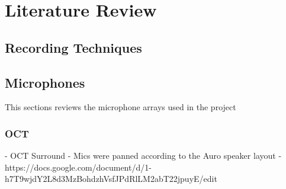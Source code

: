 
















\section{Literature Review} \label{lit}

	\subsection{Recording Techniques}

	\subsection{Microphones} \label{lit:microphones}
	
		This sections reviews the microphone arrays used in the project

		\subsubsection{OCT} \label{sec:OCT}

			- OCT Surround
		- Mics were panned according to the Auro speaker layout
			- https://docs.google.com/document/d/1-h7T9wjdY2L8d3MzBohdzhVsfJPdRlLM2abT22jpuyE/edit 